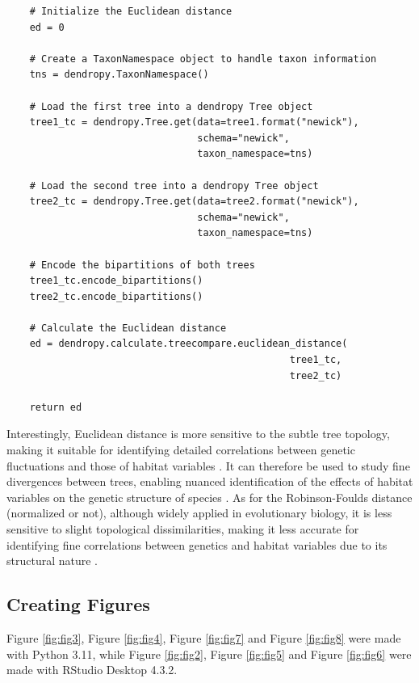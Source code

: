 {\begin{lstlisting}
    # Initialize the Euclidean distance 
    ed = 0
    
    # Create a TaxonNamespace object to handle taxon information
    tns = dendropy.TaxonNamespace()

    # Load the first tree into a dendropy Tree object
    tree1_tc = dendropy.Tree.get(data=tree1.format("newick"),
                                 schema="newick",
                                 taxon_namespace=tns)

    # Load the second tree into a dendropy Tree object
    tree2_tc = dendropy.Tree.get(data=tree2.format("newick"),
                                 schema="newick",
                                 taxon_namespace=tns)

    # Encode the bipartitions of both trees
    tree1_tc.encode_bipartitions()
    tree2_tc.encode_bipartitions()

    # Calculate the Euclidean distance
    ed = dendropy.calculate.treecompare.euclidean_distance(
                                                 tree1_tc, 
                                                 tree2_tc)

    return ed
\end{lstlisting}

Interestingly, Euclidean distance is more sensitive to the subtle tree topology, making it suitable for identifying detailed correlations between genetic fluctuations and those of habitat variables \citep{czarna2006topology}. It can therefore be used to study fine divergences between trees, enabling nuanced identification of the effects of habitat variables on the genetic structure of species \citep{czarna2006topology}. As for the Robinson-Foulds distance (normalized or not), although widely applied in evolutionary biology, it is less sensitive to slight topological dissimilarities, making it less accurate for identifying fine correlations between genetics and habitat variables due to its structural nature \citep{smith2019bayesian, smith2020information}.

\subsection{Creating Figures}\label{Figures}
Figure \ref{fig:fig3}, Figure \ref{fig:fig4}, Figure \ref{fig:fig7} and Figure \ref{fig:fig8} were made with Python 3.11, while Figure \ref{fig:fig2}, Figure \ref{fig:fig5} and Figure \ref{fig:fig6} were made with RStudio Desktop 4.3.2.

}
